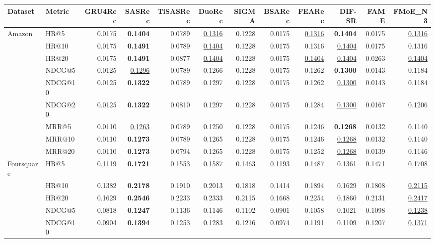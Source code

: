 \begin{tabular}{llrrrrrrrrrr}
\hline
Dataset & Metric & GRU4Rec & SASRec & TiSASRec & DuoRec & SIGMA & BSARec & FEARec & DIF-SR & FAME & FMoE\_N3 \\
\hline
Amazon & HR@5 & 0.0175 & \textbf{0.1404} & 0.0789 & \underline{0.1316} & 0.1228 & 0.0175 & \underline{0.1316} & \textbf{0.1404} & 0.0175 & \underline{0.1316} \\
 & HR@10 & 0.0175 & \textbf{0.1491} & 0.0789 & \underline{0.1404} & 0.1228 & 0.0175 & 0.1316 & \underline{0.1404} & 0.0175 & 0.1316 \\
 & HR@20 & 0.0175 & \textbf{0.1491} & 0.0877 & \underline{0.1404} & 0.1228 & 0.0175 & \underline{0.1404} & \underline{0.1404} & 0.0263 & \underline{0.1404} \\
 & NDCG@5 & 0.0125 & \underline{0.1296} & 0.0789 & 0.1266 & 0.1228 & 0.0175 & 0.1262 & \textbf{0.1300} & 0.0143 & 0.1184 \\
 & NDCG@10 & 0.0125 & \textbf{0.1322} & 0.0789 & 0.1297 & 0.1228 & 0.0175 & 0.1262 & \underline{0.1300} & 0.0143 & 0.1184 \\
 & NDCG@20 & 0.0125 & \textbf{0.1322} & 0.0810 & 0.1297 & 0.1228 & 0.0175 & 0.1284 & \underline{0.1300} & 0.0167 & 0.1206 \\
 & MRR@5 & 0.0110 & \underline{0.1263} & 0.0789 & 0.1250 & 0.1228 & 0.0175 & 0.1246 & \textbf{0.1268} & 0.0132 & 0.1140 \\
 & MRR@10 & 0.0110 & \textbf{0.1273} & 0.0789 & 0.1265 & 0.1228 & 0.0175 & 0.1246 & \underline{0.1268} & 0.0132 & 0.1140 \\
 & MRR@20 & 0.0110 & \textbf{0.1273} & 0.0794 & 0.1265 & 0.1228 & 0.0175 & 0.1252 & \underline{0.1268} & 0.0139 & 0.1146 \\
\hline
Foursquare & HR@5 & 0.1119 & \textbf{0.1721} & 0.1553 & 0.1587 & 0.1463 & 0.1193 & 0.1487 & 0.1361 & 0.1471 & \underline{0.1708} \\
 & HR@10 & 0.1382 & \textbf{0.2178} & 0.1910 & 0.2013 & 0.1818 & 0.1414 & 0.1894 & 0.1629 & 0.1808 & \underline{0.2115} \\
 & HR@20 & 0.1629 & \textbf{0.2546} & 0.2233 & 0.2333 & 0.2115 & 0.1668 & 0.2254 & 0.1860 & 0.2131 & \underline{0.2417} \\
 & NDCG@5 & 0.0818 & \textbf{0.1247} & 0.1136 & 0.1146 & 0.1102 & 0.0901 & 0.1058 & 0.1021 & 0.1098 & \underline{0.1238} \\
 & NDCG@10 & 0.0904 & \textbf{0.1394} & 0.1253 & 0.1283 & 0.1216 & 0.0974 & 0.1191 & 0.1109 & 0.1207 & \underline{0.1371} \\

\end{tabular}
